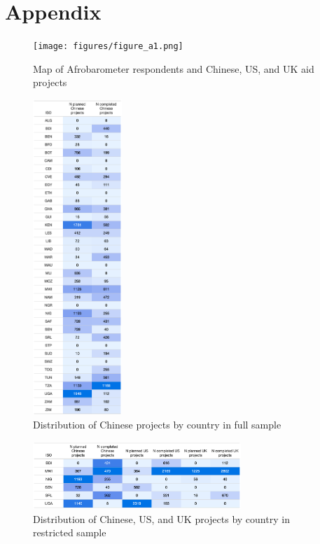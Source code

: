 \documentclass[9pt]{article}
\begin{document}
\renewcommand\thefigure{A\arabic{figure}}    
\renewcommand\thetable{A\arabic{table}}    

\setcounter{figure}{0} 
\setcounter{table}{0} 

\newpage
\appendix
\section{Appendix}

\begin{figure}[H]
\centering
\texttt{[image: figures/figure\_a1.png]}
\caption{Map of Afrobarometer respondents and Chinese, US, and UK aid projects}
\end{figure}

\begin{figure}[H]
\centering
\includegraphics[width=0.3\textwidth]{figures/figure_a2.png}
\caption{Distribution of Chinese projects by country in full sample}
\end{figure}

\begin{figure}[H]
\centering
\includegraphics[width=0.7\textwidth]{figures/figure_a3.png}
\caption{Distribution of Chinese, US, and UK projects by country in restricted sample}
\end{figure}
\end{document}
